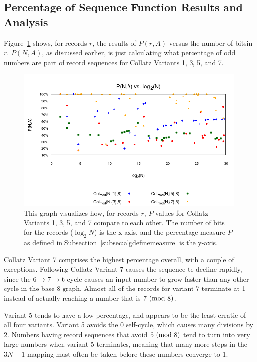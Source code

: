 \subsection{Percentage of Sequence Function Results and Analysis} \label{subsubsec:algsinpercentage}
 Figure~\ref{fig:pvslog} shows, for records $r$, the results of $P(r,A)$ versus the number of bitsin $r$. $P(N,A)$, as discussed earlier, is just calculating what percentage of odd numbers are part of record sequences for Collatz Variants 1, 3, 5, and 7. \par
\begin{figure}
    \centering
    \includegraphics[scale=0.6]{ModAvoidanceAnalysisPics/P_vs_log.png}
    \caption{This graph visualizes how, for records $r$, $P$ values for Collatz Variants 1, 3, 5, and 7 compare to each other. The number of bits for the records ($\log_2{N}$) is the x-axis, and the percentage measure $P$ as defined in Subsection~\ref{subsec:algdefinemeasure} is the y-axis.}
    \label{fig:pvslog}
\end{figure}
Collatz Variant 7 comprises the highest percentage overall, with a couple of exceptions. Following Collatz Variant 7 causes the sequence to decline rapidly, since the $6 \rightarrow 7 \rightarrow 6$ cycle causes an input number to grow faster than any other cycle in the base 8 graph. Almost all of the records for variant 7 terminate at 1 instead of actually reaching a number that is $7 \ (\mathrm{mod}\ 8)$. \par
Variant 5 tends to have a low percentage, and appears to be the least erratic of all four variants. Variant 5 avoids the 0 self-cycle, which causes many divisions by 2. Numbers having record sequences that avoid $5 \ (\mathrm{mod}\ 8)$ tend to turn into very large numbers when variant 5 terminates, meaning that many more steps in the $3N+1$ mapping must often be taken before these numbers converge to 1. \par

